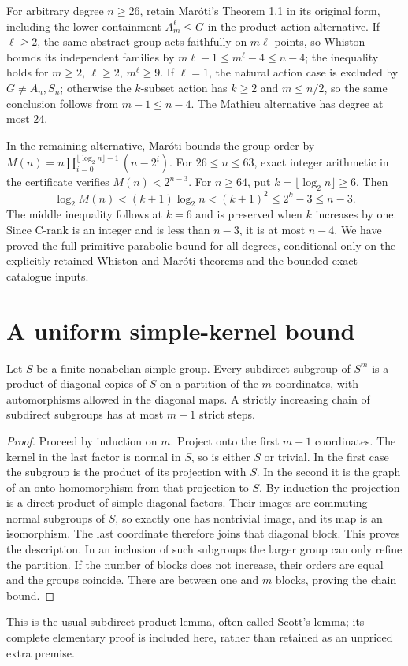 For arbitrary degree $n\geq26$, retain Mar\'oti's Theorem 1.1 in its
original form, including the lower containment $A_m^\ell\leq G$ in
the product-action alternative. If $\ell\geq2$, the same abstract
group acts faithfully on $m\ell$ points, so Whiston bounds its
independent families by $m\ell-1\leq m^\ell-4\leq n-4$; the
inequality holds for $m\geq2$, $\ell\geq2$, $m^\ell\geq9$.
If $\ell=1$, the natural action case is excluded by $G\ne A_n,S_n$;
otherwise the $k$-subset action has $k\geq2$ and $m\leq n/2$,
so the same conclusion follows from $m-1\leq n-4$.
The Mathieu alternative has degree at most 24.

In the remaining alternative, Mar\'oti bounds the group order by
$M(n)=n\prod_{i=0}^{\lfloor\log_2n\rfloor-1}(n-2^i)$.
For $26\leq n\leq63$, exact integer arithmetic in the certificate
verifies $M(n)<2^{n-3}$. For $n\geq64$, put
$k=\lfloor\log_2n\rfloor\geq6$. Then
\[
 \log_2M(n)<(k+1)\log_2n<(k+1)^2\leq2^k-3\leq n-3.
\]
The middle inequality follows at $k=6$ and is preserved when $k$
increases by one. Since C-rank is an integer and is less than $n-3$,
it is at most $n-4$. We have proved the full primitive-parabolic
bound for all degrees, conditional only on the explicitly retained
Whiston and Mar\'oti theorems and the bounded exact catalogue inputs.

\section{A uniform simple-kernel bound}
\begin{lemma}\label{lem:scott}
Let $S$ be a finite nonabelian simple group. Every subdirect subgroup
of $S^m$ is a product of diagonal copies of $S$ on a partition of the
$m$ coordinates, with automorphisms allowed in the diagonal maps.
A strictly increasing chain of subdirect subgroups has at most $m-1$
strict steps.
\end{lemma}
\begin{proof}
Proceed by induction on $m$. Project onto the first $m-1$ coordinates.
The kernel in the last factor is normal in $S$, so is either $S$ or
trivial. In the first case the subgroup is the product of its projection
with $S$. In the second it is the graph of an onto homomorphism from
that projection to $S$. By induction the projection is a direct product
of simple diagonal factors. Their images are commuting normal subgroups
of $S$, so exactly one has nontrivial image, and its map is an
isomorphism. The last coordinate therefore joins that diagonal block.
This proves the description. In an inclusion of such subgroups the
larger group can only refine the partition. If the number of blocks
does not increase, their orders are equal and the groups coincide.
There are between one and $m$ blocks, proving the chain bound.
\end{proof}
This is the usual subdirect-product lemma, often called Scott's lemma;
its complete elementary proof is included here, rather than retained
as an unpriced extra premise.

